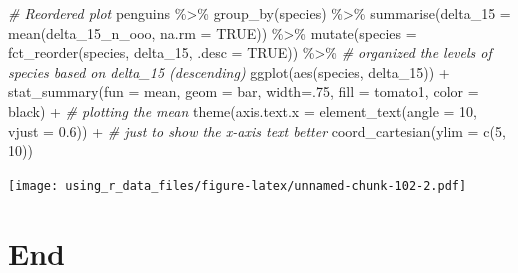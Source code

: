 \documentclass[
]{book}
\newenvironment{Shaded}{\begin{snugshade}}{\end{snugshade}}
\newcommand{\AttributeTok}[1]{\textcolor[rgb]{0.77,0.63,0.00}{#1}}
\newcommand{\CommentTok}[1]{\textcolor[rgb]{0.56,0.35,0.01}{\textit{#1}}}
\newcommand{\ConstantTok}[1]{\textcolor[rgb]{0.00,0.00,0.00}{#1}}
\newcommand{\DecValTok}[1]{\textcolor[rgb]{0.00,0.00,0.81}{#1}}
\newcommand{\FloatTok}[1]{\textcolor[rgb]{0.00,0.00,0.81}{#1}}
\newcommand{\FunctionTok}[1]{\textcolor[rgb]{0.00,0.00,0.00}{#1}}
\newcommand{\NormalTok}[1]{#1}
\newcommand{\SpecialCharTok}[1]{\textcolor[rgb]{0.00,0.00,0.00}{#1}}
\newcommand{\StringTok}[1]{\textcolor[rgb]{0.31,0.60,0.02}{#1}}
\begin{document}
\begin{Shaded}
\begin{Highlighting}[]
\CommentTok{\# Reordered plot}
\NormalTok{penguins }\SpecialCharTok{\%\textgreater{}\%} 
  \FunctionTok{group\_by}\NormalTok{(species) }\SpecialCharTok{\%\textgreater{}\%} 
  \FunctionTok{summarise}\NormalTok{(}\AttributeTok{delta\_15 =} \FunctionTok{mean}\NormalTok{(delta\_15\_n\_ooo, }\AttributeTok{na.rm =} \ConstantTok{TRUE}\NormalTok{)) }\SpecialCharTok{\%\textgreater{}\%} 
  \FunctionTok{mutate}\NormalTok{(}\AttributeTok{species =} \FunctionTok{fct\_reorder}\NormalTok{(species, delta\_15, }\AttributeTok{.desc =} \ConstantTok{TRUE}\NormalTok{)) }\SpecialCharTok{\%\textgreater{}\%}  \CommentTok{\# organized the levels of species based on delta\_15 (descending)}
  \FunctionTok{ggplot}\NormalTok{(}\FunctionTok{aes}\NormalTok{(species, delta\_15)) }\SpecialCharTok{+}
  \FunctionTok{stat\_summary}\NormalTok{(}\AttributeTok{fun =}\NormalTok{ mean, }\AttributeTok{geom =} \StringTok{\textquotesingle{}bar\textquotesingle{}}\NormalTok{, }\AttributeTok{width=}\NormalTok{.}\DecValTok{75}\NormalTok{, }\AttributeTok{fill =} \StringTok{\textquotesingle{}tomato1\textquotesingle{}}\NormalTok{, }\AttributeTok{color =} \StringTok{\textquotesingle{}black\textquotesingle{}}\NormalTok{) }\SpecialCharTok{+}  \CommentTok{\# plotting the mean}
  \FunctionTok{theme}\NormalTok{(}\AttributeTok{axis.text.x =} \FunctionTok{element\_text}\NormalTok{(}\AttributeTok{angle =} \DecValTok{10}\NormalTok{, }\AttributeTok{vjust =} \FloatTok{0.6}\NormalTok{)) }\SpecialCharTok{+} \CommentTok{\# just to show the x{-}axis text better}
  \FunctionTok{coord\_cartesian}\NormalTok{(}\AttributeTok{ylim =} \FunctionTok{c}\NormalTok{(}\DecValTok{5}\NormalTok{, }\DecValTok{10}\NormalTok{))}
\end{Highlighting}
\end{Shaded}

\texttt{[image: using\_r\_data\_files/figure-latex/unnamed-chunk-102-2.pdf]}

\hypertarget{end-1}{%
\section{End}\label{end-1}}

  
\end{document}
